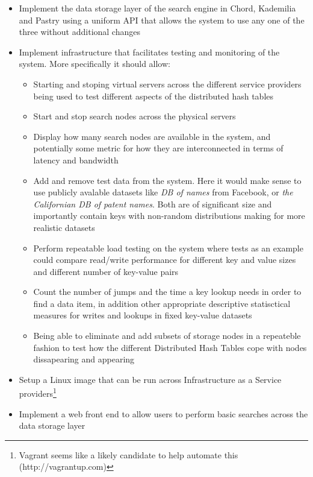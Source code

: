 \begin{itemize}
  \item Implement the data storage layer of the search engine in Chord, Kademilia and Pastry using a uniform API that allows the system to use any one of the three without additional changes
  
  \item Implement infrastructure that facilitates testing and monitoring of the system. More specifically it should allow:

  \begin{itemize}
    \item Starting and stoping virtual servers across the different service providers being used to test different aspects of the distributed hash tables
    \item Start and stop search nodes across the physical servers
    \item Display how many search nodes are available in the system, and potentially some metric for how they are interconnected in terms of latency and bandwidth
    \item Add and remove test data from the system. Here it would make sense to use publicly avalable datasets like \emph{DB of names} from Facebook, or \emph{the Californian DB of patent names}. Both are of significant size and importantly contain keys with non-random distributions making for more realistic datasets
    \item Perform repeatable load testing on the system where tests as an example could compare read/write performance for different key and value sizes and different number of key-value pairs
    \item Count the number of jumps and the time a key lookup needs in order to find a data item, in addition other appropriate descriptive statisctical measures for writes and lookups in fixed key-value datasets
    \item Being able to eliminate and add subsets of storage nodes in a repeateble fashion to test how the different Distributed Hash Tables cope with nodes dissapearing and appearing
  \end{itemize}

  \item Setup a Linux image that can be run across Infrastructure as a Service providers\footnote{Vagrant seems like a likely candidate to help automate this (http://vagrantup.com)}

  \item Implement a web front end to allow users to perform basic searches across the data storage layer

\end{itemize}

